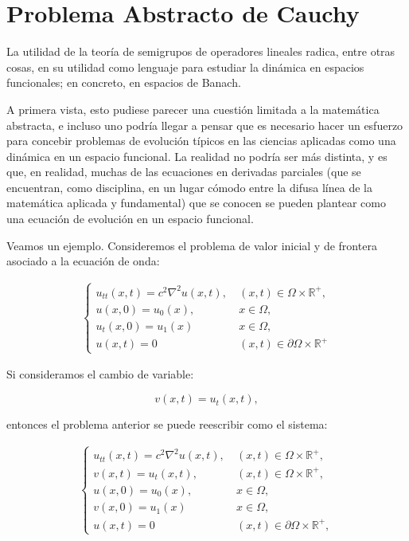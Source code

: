 \chapter{Problema Abstracto de Cauchy}
\label{ch:cauchy}
La utilidad de la teoría de semigrupos de operadores lineales radica, entre otras cosas, en su utilidad como lenguaje para estudiar la dinámica en espacios funcionales; en concreto, en espacios de Banach. 

A primera vista, esto pudiese parecer una cuestión limitada a la matemática abstracta, e incluso uno podría llegar a pensar que es necesario hacer un esfuerzo para concebir problemas de evolución típicos en las ciencias aplicadas como una dinámica en un espacio funcional. La realidad no podría ser más distinta, y es que, en realidad, muchas de las ecuaciones en derivadas parciales (que se encuentran, como disciplina, en un lugar cómodo entre la difusa línea de la matemática aplicada y fundamental) que se conocen se pueden plantear como una ecuación de evolución en un espacio funcional. 

Veamos un ejemplo. Consideremos el problema de valor inicial y de frontera asociado a la ecuación de onda:

\begin{align}
\label{eqOnda}
    \begin{cases}
        u_{tt}(x,t) = c^2 \nabla^2 u(x,t), \ &(x,t) \in \Omega \times \mathbb{R}^+,\\
        u(x,0) = u_0(x), \ &x \in \Omega,\\
        u_t(x,0)  = u_1(x) \ &x \in \Omega,\\
        u(x,t) = 0 \ &(x,t) \in \partial \Omega \times \mathbb{R}^+ 
    \end{cases}
\end{align}

Si consideramos el cambio de variable:

\[v(x,t) = u_t(x,t),\]

entonces el problema anterior se puede reescribir como el sistema:

\begin{align}
\label{eqOndaCambioDeVar}
    \begin{cases}
        u_{tt}(x,t) = c^2 \nabla^2 u(x,t), \ &(x,t) \in \Omega \times \mathbb{R}^+,\\
        v(x,t) = u_t(x,t), \ &(x,t) \in \Omega \times \mathbb{R}^+,\\
        u(x,0) = u_0(x), \ &x \in \Omega,\\
        v(x,0)  = u_1(x) \ &x \in \Omega,\\
        u(x,t) = 0 \ &(x,t) \in \partial \Omega \times \mathbb{R}^+,
    \end{cases}
\end{align}

